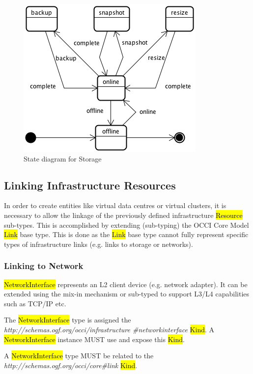 \documentclass[10pt,a4paper]{article}
\begin{document}
\begin{figure}[!h]
	\centering
	\includegraphics[scale=0.4]{figs/storage-state.png}
	\caption{State diagram for Storage}
	\label{fig:storage_state}
\end{figure}

\subsection{Linking Infrastructure Resources}
In order to create entities like virtual data centres or virtual clusters, it is necessary to allow the linkage of the previously defined infrastructure \hl{Resource} sub-types. This is accomplished by extending (sub-typing) the OCCI Core Model \hl{Link} base type. This is done as the \hl{Link} base type cannot fully represent specific types of infrastructure links (e.g. links to storage or networks).

\subsubsection{Linking to Network}
\hl{NetworkInterface} represents an L2 client device (e.g. network adapter). It can be extended using the mix-in mechanism or sub-typed to support L3/L4 capabilities such as TCP/IP etc. 

The \hl{NetworkInterface} type is assigned the \textit{http://schemas.ogf.org/occi/infrastructure
\#networkinterface} \hl{Kind}. A \hl{NetworkInterface} instance MUST use and expose this \hl{Kind}. 

A \hl{NetworkInterface} type MUST be related to the \textit{http://schemas.ogf.org/occi/core\#link} 
\hl{Kind}.
\end{document}
